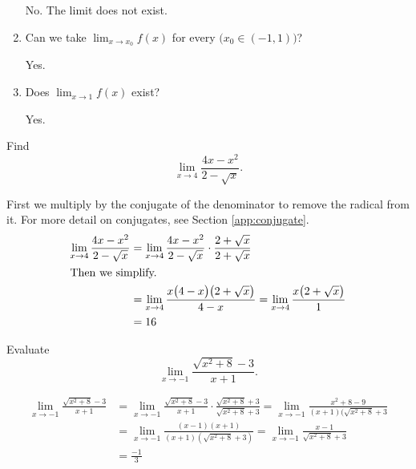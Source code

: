 \begin{ex}
\begin{enumerate}
      \begin{sol}
        No. The limit does not exist.
      \end{sol}
    \item Can we take \( \lim_{x \to x_0} f(x)\) for every \(\big(x_0 \in (-1, 1)\big)\)?

      \begin{sol}
        Yes.
      \end{sol}
    \item Does \( \lim_{x \to 1} f(x) \) exist?

      \begin{sol}
        Yes.
      \end{sol}
  \end{enumerate}
\end{ex}
\begin{ex}
  Find
  \[ \lim_{x \to 4} \frac{4x-x^2}{2-\sqrt x} \text{.} \]
  \begin{sol}
    First we multiply by the conjugate of the denominator to remove the radical from it. For more detail on conjugates, see Section \ref{app:conjugate}.
    \begin{align*}
      \lim_{x \to 4} \frac{4x-x^2}{2-\sqrt x}
      &= \lim_{x \to 4} \frac{4x-x^2}{2-\sqrt x} \cdot \frac{2+\sqrt x}{2+\sqrt x}\\
      \intertext{Then we simplify.}
      &=\lim_{x \to 4} \frac{x\big(4-x\big)\big(2+\sqrt{x}\big)}{4-x}
       = \lim_{x \to 4} \frac{x\big(2+\sqrt{x}\big)}{1} \\
      &= 16
    \end{align*}
  \end{sol}
\end{ex}
\begin{ex}
  Evaluate
  \[ \lim_{x \to -1} \frac{\sqrt{x^2+8}-3}{x+1} \text{.} \]
  \begin{sol}
    \begin{align*}
      \lim_{x \to -1} \frac{\sqrt{x^2+8}-3}{x+1}
      &= \lim_{x \to -1} \frac{\sqrt{x^2+8}-3}{x+1} \cdot \frac{\sqrt{x^2+8}+3}{\sqrt{x^2+8}+3}
      = \lim_{x \to -1} \frac{x^2+8-9}{(x+1)(\sqrt{x^2+8}+3} \\
      &= \lim_{x \to -1} \frac{(x-1)(x+1)}{(x+1)(\sqrt{x^2+8}+3)}
      = \lim_{x \to -1} \frac{x-1}{\sqrt{x^2+8}+3} \\
      &= \frac{-1}{3}
    \end{align*}
  \end{sol}
\end{ex}


